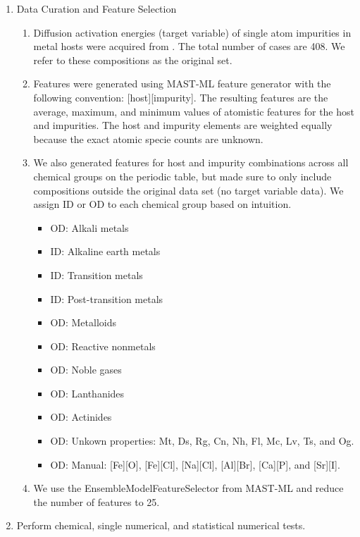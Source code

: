 \begin{enumerate}

    \item Data Curation and Feature Selection
    
    \begin{enumerate}
        \item Diffusion activation energies (target variable) of single atom impurities in metal hosts were acquired from \cite{Lu2019, Wu2017}. The total number of cases are 408. We refer to these compositions as the original set.
        \item Features were generated using MAST-ML feature generator with the following convention: [host][impurity]. The resulting features are the average, maximum, and minimum values of atomistic features for the host and impurities. The host and impurity elements are weighted equally because the exact atomic specie counts are unknown.
        \item We also generated features for host and impurity combinations across all chemical groups on the periodic table, but made sure to only include compositions outside the original data set (no target variable data). We assign ID or OD to each chemical group based on intuition.

        \begin{itemize}
            \item OD: Alkali metals
            \item ID: Alkaline earth metals
            \item ID: Transition metals
            \item ID: Post-transition metals
            \item OD: Metalloids
            \item OD: Reactive nonmetals
            \item OD: Noble gases
            \item OD: Lanthanides
            \item OD: Actinides
            \item OD: Unkown properties: Mt, Ds, Rg, Cn, Nh, Fl, Mc, Lv, Ts, and Og.
            \item OD: Manual: [Fe][O], [Fe][Cl], [Na][Cl], [Al][Br], [Ca][P], and [Sr][I].
        \end{itemize}

        \item We use the EnsembleModelFeatureSelector from MAST-ML and reduce the number of features to 25.
    
    \end{enumerate}

    \item Perform chemical, single numerical, and statistical numerical tests.
    
  \end{enumerate}

